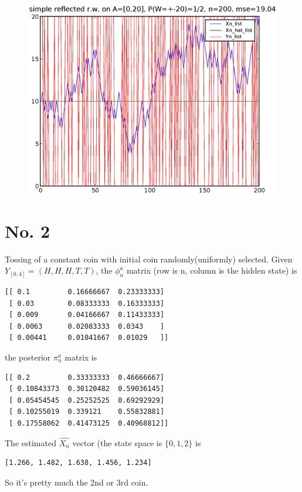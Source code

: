 \documentclass[a4paper,10pt]{article}
\begin{document}
\begin{figure}
\includegraphics[width=1\textwidth]{hw5_1_K_20_L_20_n_200.eps}
\caption{}
\end{figure}

\section{No. 2}
Tossing of a constant coin with initial coin randomly(uniformly) selected. Given $Y_{[0,4]} = (H, H, H, T, T)$, the $\phi^a_n$ matrix (row is n, column is the hidden state) is

\begin{verbatim}
[[ 0.1         0.16666667  0.23333333]
 [ 0.03        0.08333333  0.16333333]
 [ 0.009       0.04166667  0.11433333]
 [ 0.0063      0.02083333  0.0343    ]
 [ 0.00441     0.01041667  0.01029   ]]
\end{verbatim}

the posterior $\pi^a_n$ matrix is
\begin{verbatim}
[[ 0.2         0.33333333  0.46666667]
 [ 0.10843373  0.30120482  0.59036145]
 [ 0.05454545  0.25252525  0.69292929]
 [ 0.10255019  0.339121    0.55832881]
 [ 0.17558062  0.41473125  0.40968812]]
\end{verbatim}

The estimated $\hat{X_n}$ vector (the state space is $\{0,1,2\}$ is
\begin{verbatim}
[1.266, 1.482, 1.638, 1.456, 1.234]
\end{verbatim}

So it's pretty much the 2nd or 3rd coin.
\end{document}
